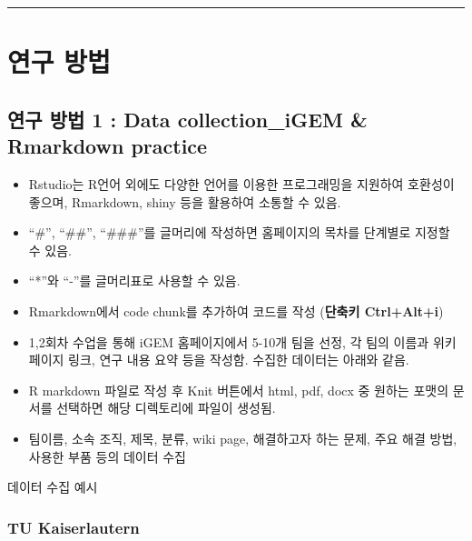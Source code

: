 \documentclass[
]{article}
\begin{document}
\begin{center}\rule{0.5\linewidth}{0.5pt}\end{center}

\hypertarget{uxc5f0uxad6c-uxbc29uxbc95}{%
\section{연구 방법}\label{uxc5f0uxad6c-uxbc29uxbc95}}

\hypertarget{uxc5f0uxad6c-uxbc29uxbc95-1-data-collection_igem-rmarkdown-practice}{%
\subsection{연구 방법 1 : Data collection\_iGEM \& Rmarkdown
practice}\label{uxc5f0uxad6c-uxbc29uxbc95-1-data-collection_igem-rmarkdown-practice}}

\begin{itemize}
\item
  Rstudio는 R언어 외에도 다양한 언어를 이용한 프로그래밍을 지원하여
  호환성이 좋으며, Rmarkdown, shiny 등을 활용하여 소통할 수 있음.
\item
  ``\#'', ``\#\#'', ``\#\#\#''를 글머리에 작성하면 홈페이지의 목차를
  단계별로 지정할 수 있음.
\item
  ``*''와 ``-''를 글머리표로 사용할 수 있음.
\item
  Rmarkdown에서 code chunk를 추가하여 코드를 작성 (\textbf{단축키
  Ctrl+Alt+i})
\item
  1,2회차 수업을 통해 iGEM 홈페이지에서 5-10개 팀을 선정, 각 팀의 이름과
  위키페이지 링크, 연구 내용 요약 등을 작성함. 수집한 데이터는 아래와
  같음.
\item
  R markdown 파일로 작성 후 Knit 버튼에서 html, pdf, docx 중 원하는
  포맷의 문서를 선택하면 해당 디렉토리에 파일이 생성됨.
\item
  팀이름, 소속 조직, 제목, 분류, wiki page, 해결하고자 하는 문제, 주요
  해결 방법, 사용한 부품 등의 데이터 수집
\end{itemize}

데이터 수집 예시

\hypertarget{tu-kaiserlautern}{%
\subsubsection{TU Kaiserlautern}\label{tu-kaiserlautern}}
\end{document}
